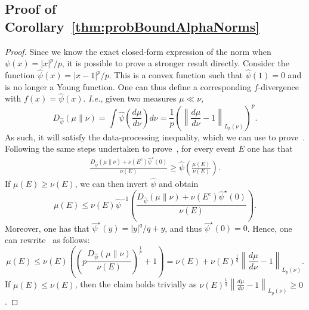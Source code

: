 \documentclass[11pt]{article}
\theoremstyle{plain}
\theoremstyle{remark}
\begin{document}
\subsection{Proof of Corollary~\ref{thm:probBoundAlphaNorms}}\label{app:proofProbBoundAlphaNorms}
\begin{proof}
    Since we know the exact closed-form expression of the norm when $\psi(x)=|x|^p/p$, it is possible to prove a stronger result directly.
Consider the function $\hat{\psi}(x)=|x-1|^p/p$. This is a convex function such that $\hat{\psi}(1)=0$ and is no longer a Young function. One can thus define a corresponding $f$-divergence~\cite{fDiv} with $f(x) =\hat{\psi}(x)$. \textit{I.e.}, given two measures $\mu\ll\nu$,
\begin{equation}
    D_{\hat{\psi}}(\mu\|\nu) = \int \hat\psi\left(\frac{d\mu}{d\nu}\right) d\nu =  \frac1p \left(\left\lVert \frac{d\mu}{d\nu}-1\right\rVert_{L_p(\nu)}\right)^p.
\end{equation} As such, it will satisfy the data-processing inequality, which we can use to prove~. Following the same steps undertaken to prove~\cite[Theorem 3]{fullVersionGeneralization}, for every event $E$ one has that 
\begin{align}
     \frac{D_{\hat{\psi}}(\mu\|\nu)+\nu(E^c){\hat{\psi}}^\star(0)}{\nu(E)} \geq \hat{\psi}\left(\frac{\mu(E)}{\nu(E)}\right).
\end{align}
If $\mu(E)\geq \nu(E)$, we can then invert $\hat{\psi}$  and obtain
\begin{equation}
    \mu(E)\leq \nu(E) \hat{\psi}^{-1}\left(\frac{D_{\hat{\psi}}(\mu\|\nu)+\nu(E^c){\hat{\psi}}^\star(0)}{\nu(E)}\right). \label{eq:probBoundAlphaNorms}
\end{equation}
Moreover, one has that $\hat{\psi}^\star(y) = |y|^q/q + y$, and thus $\hat{\psi}^\star(0)=0$.
Hence, one can rewrite~ as follows:
\begin{equation}
     \mu(E)\leq \nu(E)\left(\left(p\frac{D_{\hat{\psi}}(\mu\|\nu)}{\nu(E)}\right)^\frac{1}{p}+1\right) = \nu(E)+\nu(E)^\frac1q \left\lVert \frac{d\mu}{d\nu}-1\right\rVert_{L_p(\nu)} . 
\end{equation}
If $\mu(E) \leq \nu(E)$, then the claim holds trivially as $\nu(E)^\frac1q \left\lVert \frac{d\mu}{d\nu}-1\right\rVert_{L_p(\nu)} \geq 0$.
\end{proof}
\end{document}
